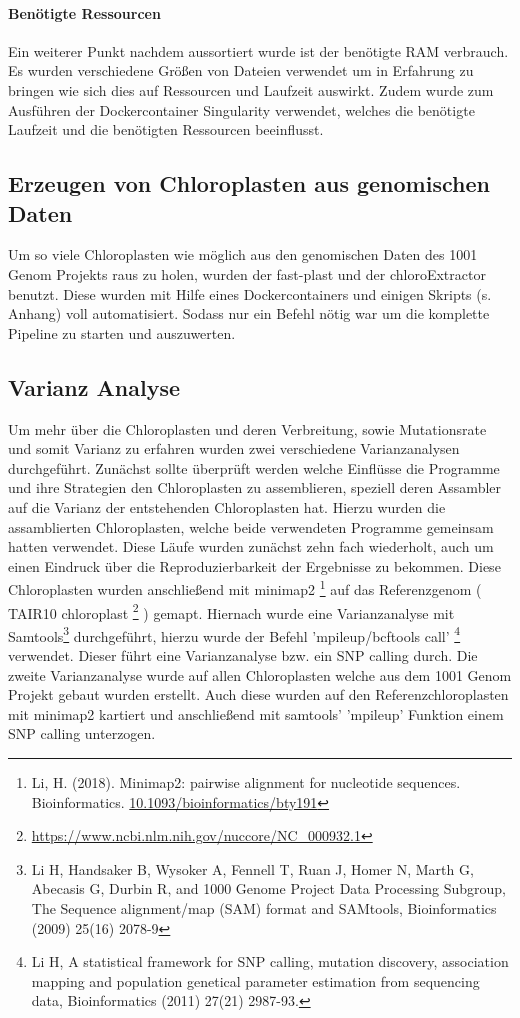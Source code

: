 \documentclass{scrartcl}
\begin{document}
\paragraph{Benötigte Ressourcen}
\label{sec-2-1-2-4}
Ein weiterer Punkt nachdem aussortiert wurde ist der benötigte RAM verbrauch. Es wurden verschiedene Größen von Dateien verwendet
um in Erfahrung zu bringen wie sich dies auf Ressourcen und Laufzeit auswirkt. Zudem wurde zum Ausführen der Dockercontainer 
Singularity \footnotemark[40]{} verwendet, welches die benötigte Laufzeit und die benötigten Ressourcen beeinflusst.


\subsection{Erzeugen von Chloroplasten aus genomischen Daten}
\label{sec-2-2}
Um so viele Chloroplasten wie möglich aus den genomischen Daten des 1001 Genom Projekts raus zu holen, wurden der fast-plast und der chloroExtractor benutzt.
Diese wurden mit Hilfe eines Dockercontainers und einigen Skripts (s. Anhang) voll automatisiert. Sodass nur ein Befehl nötig war um die komplette 
Pipeline zu starten und auszuwerten. 

\subsection{Varianz Analyse}
\label{sec-2-3}
Um mehr über die Chloroplasten und deren Verbreitung, sowie Mutationsrate und somit Varianz zu erfahren wurden zwei verschiedene Varianzanalysen durchgeführt. 
Zunächst sollte überprüft werden welche Einflüsse die Programme und ihre Strategien den Chloroplasten zu assemblieren, speziell deren Assambler auf die Varianz der 
entstehenden Chloroplasten hat. Hierzu wurden die assamblierten Chloroplasten, welche beide verwendeten Programme gemeinsam hatten verwendet. Diese Läufe wurden zunächst
zehn fach wiederholt, auch um einen Eindruck über die Reproduzierbarkeit der Ergebnisse zu bekommen. Diese Chloroplasten wurden anschließend mit minimap2 \footnote{Li, H. (2018). Minimap2: pairwise alignment for nucleotide sequences. Bioinformatics. \url{10.1093/bioinformatics/bty191}} auf das 
Referenzgenom ( TAIR10 chloroplast \footnote{\url{https://www.ncbi.nlm.nih.gov/nuccore/NC_000932.1}} ) gemapt. Hiernach wurde eine Varianzanalyse mit Samtools\footnote{Li H, Handsaker B, Wysoker A, Fennell T, Ruan J, Homer N, Marth G, Abecasis G, Durbin R, and 1000 Genome Project Data Processing Subgroup, The Sequence alignment/map (SAM) format and SAMtools, Bioinformatics (2009) 25(16) 2078-9 \footnotemark} durchgeführt, hierzu wurde der Befehl
'mpileup/bcftools call' \footnote{Li H, A statistical framework for SNP calling, mutation discovery, association mapping and population genetical parameter estimation from sequencing data, Bioinformatics (2011) 27(21) 2987-93. \footnotemark} verwendet. Dieser führt eine Varianzanalyse bzw. ein SNP calling durch. Die zweite Varianzanalyse wurde auf allen Chloroplasten welche aus dem
1001 Genom Projekt gebaut wurden erstellt. Auch diese wurden auf den Referenzchloroplasten mit minimap2 kartiert und anschließend mit samtools' 'mpileup' Funktion einem
SNP calling unterzogen. 
\end{document}
